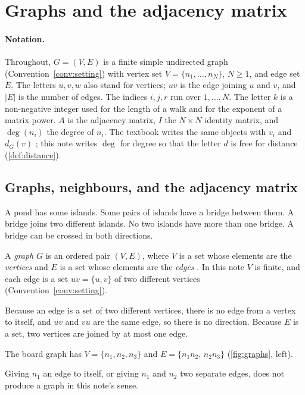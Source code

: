 \section{Graphs and the adjacency matrix}\label{sec:background}

\paragraph{Notation.} Throughout, $G=(V,E)$ is a finite simple undirected
graph (Convention~\ref{conv:setting}) with vertex set
$V=\{n_1,\dots,n_N\}$, $N\ge 1$, and edge set $E$. The letters $u,v,w$
also stand for vertices; $uv$ is the edge joining $u$ and $v$, and
$|E|$ is the number of edges. The indices $i,j,r$ run over $1,\dots,N$.
The letter $k$ is a non-negative integer used for the length of a walk and
for the exponent of a matrix power. $A$ is the adjacency matrix, $I$ the
$N\times N$ identity matrix, and $\deg(n_i)$ the degree of $n_i$. The textbook
writes the same objects with $v_i$ and $d_G(v)$
\cite[pp.~9, 16]{petrosyan2015graphs}; this note writes $\deg$ for degree so
that the letter $d$ is free for distance (\cref{def:distance}).

\subsection{Graphs, neighbours, and the adjacency matrix}

\plainwords{} A pond has some islands. Some pairs of islands have a bridge
between them. A bridge joins two different islands. No two islands have
more than one bridge. A bridge can be crossed in both directions.

\begin{definition}\label{def:graph}
A \emph{graph} $G$ is an ordered pair $(V,E)$, where $V$ is a set whose
elements are the \emph{vertices} and $E$ is a set whose elements are the
\emph{edges} \cite[Definition~1.1.1, p.~9]{petrosyan2015graphs}. In this
note $V$ is finite, and each edge is a set $uv=\{u,v\}$ of two different
vertices (Convention~\ref{conv:setting}).
\end{definition}

\begin{remark}
Because an edge is a set of two different vertices, there is no edge from
a vertex to itself, and $uv$ and $vu$ are the same edge, so there is no
direction. Because $E$ is a set, two vertices are joined by at most one
edge.
\end{remark}
\begin{example}
The board graph has $V=\{n_1,n_2,n_3\}$ and $E=\{n_1n_2,\,n_2n_3\}$
(\cref{fig:graphs}, left).
\end{example}
\begin{nonexample}
Giving $n_1$ an edge to itself, or giving $n_1$ and $n_2$ two separate
edges, does not produce a graph in this note's sense.
\end{nonexample}

